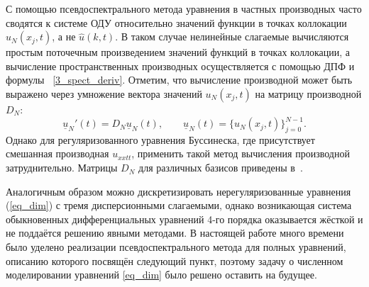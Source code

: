 \documentclass[12pt, a4paper]{report}
\newcommand{\vect}[1]{\underline{#1}}
\begin{document}
С помощью псевдоспектрального метода уравнения в частных производных часто сводятся к системе ОДУ относительно значений функции в точках коллокации $u_N(x_j, t)$, а не $\widehat u(k, t)$. В таком случае нелинейные слагаемые вычисляются простым поточечным произведением значений функций в точках коллокации, а вычисление пространственных производных осуществляется с помощью ДПФ и формулы ~\eqref{3_spect_deriv}. Отметим, что вычисление производной может быть выражено через умножение вектора значений $u_N(x_j, t)$ на матрицу производной $D_N$:
\begin{equation}\label{3_phys_deriv}
\vect{u}_N'(t) = D_N \vect{u}_N(t), \qquad \vect{u}_N(t) = \{u_N(x_j, t)\}_{j=0}^{N-1}.
\end{equation}
Однако для регуляризованного уравнения Буссинеска, где присутствует смешанная производная $u_{xxtt}$, применить такой метод вычисления производной затруднительно. Матрицы $D_N$ для различных базисов приведены в~\cite{Canuto2007}.

Аналогичным образом можно дискретизировать нерегуляризованные уравнения (\ref{eq_dim}) с тремя дисперсионными слагаемыми, однако возникающая система обыкновенных дифференциальных уравнений 4-го порядка оказывается жёсткой и не поддаётся решению явными методами. В настоящей работе много времени было уделено реализации псевдоспектрального метода для полных уравнений, описанию которого посвящён следующий пункт, поэтому задачу о численном моделировании уравнений \eqref{eq_dim} было решено оставить на будущее.
\end{document}
